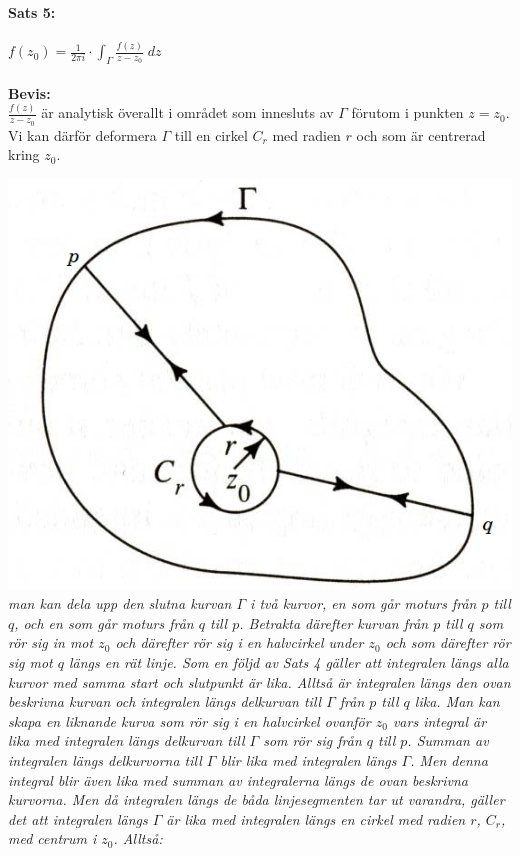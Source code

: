 \paragraph{Sats 5:} $f(z_0) = \frac 1 {2\pi i} \cdot \int_\Gamma \frac {f(z)} {z - z_0} \; dz$ \\
\\
{\bf Bevis:}\\
$\frac {f(z)} {z - z_0}$ är analytisk överallt i området som innesluts av $\Gamma$ förutom i punkten
$z = z_0$. Vi kan därför deformera $\Gamma$ till en cirkel $C_r$ med radien $r$ och 
som är centrerad kring $z_0$.
\begin{center}
	\includegraphics[scale=0.35]{linusbildp101.jpg}\\
	{\it man kan dela upp den slutna kurvan $\Gamma$ i två kurvor, en som går moturs från $p$ till $q$,
		och en som går moturs från $q$ till $p$. Betrakta därefter kurvan från $p$ till $q$ som rör sig
		in mot $z_0$ och därefter rör sig i en halvcirkel under $z_0$ och som därefter rör sig mot $q$ 
		längs en rät linje. Som en följd av Sats 4 gäller att integralen längs alla kurvor med samma 
		start och slutpunkt är lika. Alltså är integralen längs den ovan beskrivna kurvan och integralen
		längs delkurvan till $\Gamma$ från $p$ till $q$ lika. Man kan skapa en liknande kurva som rör sig
		i en halvcirkel ovanför $z_0$ vars integral är lika med integralen längs delkurvan till $\Gamma$
		som rör sig från $q$ till $p$. Summan av integralen längs delkurvorna till $\Gamma$ blir lika med
		integralen längs $\Gamma$. Men denna integral blir även lika med summan av integralerna längs
		de ovan beskrivna kurvorna. Men då integralen längs de båda linjesegmenten tar ut varandra, 
		gäller det att integralen längs $\Gamma$ är lika med integralen längs en cirkel med radien $r$,
	$C_r$, med centrum i $z_0$. Alltså:}

\end{center}

